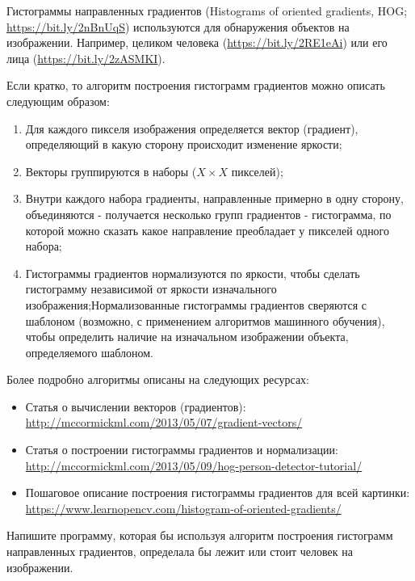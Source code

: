 
Гистограммы направленных градиентов (Histograms of oriented gradients, HOG; \url{https://bit.ly/2nBnUqS}) 
используются для обнаружения объектов на изображении. Например, целиком человека 
(\url{https://bit.ly/2RE1eAi}) или его лица (\url{https://bit.ly/2zASMKI}).

Если кратко, то алгоритм построения гистограмм градиентов можно описать следующим образом:

\begin{enumerate}
    \item Для каждого пикселя изображения определяется вектор (градиент), определяющий в какую сторону происходит изменение яркости;
    \item Векторы группируются в наборы ($X \times X$ пикселей);
    \item Внутри каждого набора градиенты, направленные примерно в одну сторону, объединяются - получается несколько групп градиентов - гистограмма, по которой можно сказать какое направление преобладает у пикселей одного набора;
    \item Гистограммы градиентов нормализуются по яркости, чтобы сделать гистограмму независимой от яркости изначального изображения;Нормализованные гистограммы градиентов сверяются с шаблоном (возможно, с применением алгоритмов машинного обучения), чтобы определить наличие на изначальном изображении объекта, определяемого шаблоном.
\end{enumerate}

Более подробно алгоритмы описаны на следующих ресурсах:

\begin{itemize}
    \item Статья о вычислении векторов (градиентов): \url{http://mccormickml.com/2013/05/07/gradient-vectors/}
    \item Статья о построении гистограммы градиентов и нормализации:\\ \url{http://mccormickml.com/2013/05/09/hog-person-detector-tutorial/}
    \item Пошаговое описание построения гистограммы градиентов для всей картинки: \url{https://www.learnopencv.com/histogram-of-oriented-gradients/}
\end{itemize}

Напишите программу, которая бы используя алгоритм построения гистограмм направленных градиентов, определала бы лежит или стоит человек на изображении.

